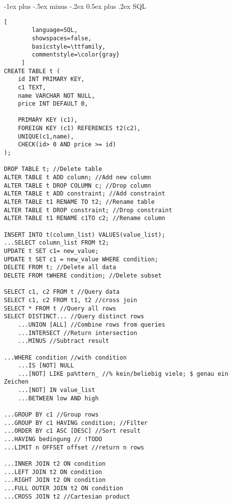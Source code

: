 \documentclass[a4paper]{article}
\makeatletter
\renewcommand{\section}{\@startsection{section}{1}{0mm}%
                                {-1ex plus -.5ex minus -.2ex}%
                                {0.5ex plus .2ex}%
                                {\normalfont\large\bfseries}}
\makeatother
\begin{document}
\raggedright
\begin{multicols}{3}
    \scriptsize
    \setlength{\premulticols}{1pt}
    \setlength{\postmulticols}{1pt}
    \setlength{\multicolsep}{1pt}
    \setlength{\columnsep}{2pt}

    \section{SQL}
\begin{lstlisting}[
        language=SQL,
        showspaces=false,
        basicstyle=\ttfamily,
        commentstyle=\color{gray}
     ]
CREATE TABLE t (
    id INT PRIMARY KEY,
    c1 TEXT,
    name VARCHAR NOT NULL,
    price INT DEFAULT 0,

    PRIMARY KEY (c1),
    FOREIGN KEY (c1) REFERENCES t2(c2),
    UNIQUE(c1,name), 
    CHECK(id> 0 AND price >= id)
);

DROP TABLE t; //Delete table
ALTER TABLE t ADD column; //Add new column
ALTER TABLE t DROP COLUMN c; //Drop column
ALTER TABLE t ADD constraint; //Add constraint
ALTER TABLE t1 RENAME TO t2; //Rename table
ALTER TABLE t DROP constraint; //Drop constraint
ALTER TABLE t1 RENAME c1TO c2; //Rename column

INSERT INTO t(column_list) VALUES(value_list);
...SELECT column_list FROM t2;
UPDATE t SET c1= new_value;
UPDATE t SET c1 = new_value WHERE condition;
DELETE FROM t; //Delete all data
DELETE FROM tWHERE condition; //Delete subset

SELECT c1, c2 FROM t //Query data
SELECT c1, c2 FROM t1, t2 //cross join
SELECT * FROM t //Query all rows
SELECT DISTINCT... //Query distinct rows
    ...UNION [ALL] //Combine rows from queries
    ...INTERSECT //Return intersection
    ...MINUS //Subtract result

...WHERE condition //with condition
    ...IS [NOT] NULL
    ...[NOT] LIKE pa%ttern_ //% kein/beliebig viele; $ genau ein Zeichen
    ...[NOT] IN value_list
    ...BETWEEN low AND high

...GROUP BY c1 //Group rows
...GROUP BY c1 HAVING condition; //Filter
...ORDER BY c1 ASC [DESC] //Sort result
...HAVING bedingung // !TODO
...LIMIT n OFFSET offset //return n rows

...INNER JOIN t2 ON condition
...LEFT JOIN t2 ON condition
...RIGHT JOIN t2 ON condition
...FULL OUTER JOIN t2 ON condition
...CROSS JOIN t2 //Cartesian product


\end{lstlisting}
\end{multicols}
\end{document}
